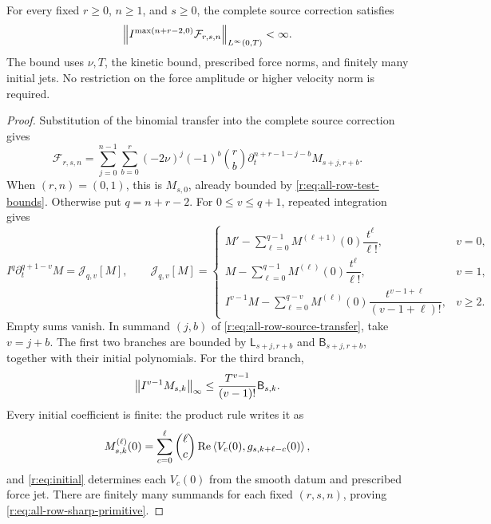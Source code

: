 \begin{proposition}
\label{r:prop:all-row-sharp-primitive}
For every fixed \(r\ge0\), \(n\ge1\), and \(s\ge0\), the complete
source correction satisfies
\begin{equation}
 \left\lVert I^{\max(n+r-2,0)}\mathcal F_{r,s,n}\right\rVert_{L^\infty(0,T)}<\infty.
 \label{r:eq:all-row-sharp-primitive}
\end{equation}
The bound uses \(\nu,T\), the kinetic bound, prescribed force norms,
and finitely many initial jets. No restriction on the force amplitude
or higher velocity norm is required.
\end{proposition}

\begin{proof}
Substitution of the binomial transfer into the complete source
correction gives
\begin{equation}
 \mathcal F_{r,s,n}
 =\sum_{j=0}^{n-1}\sum_{b=0}^r(-2\nu)^j(-1)^b\binom rb
 \partial_t^{n+r-1-j-b}M_{s+j,r+b}.
 \label{r:eq:all-row-source-transfer}
\end{equation}
When \((r,n)=(0,1)\), this is \(M_{s,0}\), already bounded by
\eqref{r:eq:all-row-test-bounds}. Otherwise put \(q=n+r-2\). For
\(0\le v\le q+1\), repeated integration gives
\begin{equation}
 I^q\partial_t^{q+1-v}M=\mathcal J_{q,v}[M],\qquad
 \mathcal J_{q,v}[M]=
 \begin{cases}
 M'-\displaystyle\sum_{\ell=0}^{q-1}
 M^{(\ell+1)}(0)\dfrac{t^\ell}{\ell!},&v=0,\\[7pt]
 M-\displaystyle\sum_{\ell=0}^{q-1}
 M^{(\ell)}(0)\dfrac{t^\ell}{\ell!},&v=1,\\[7pt]
 I^{v-1}M-\displaystyle\sum_{\ell=0}^{q-v}
 M^{(\ell)}(0)\dfrac{t^{v-1+\ell}}{(v-1+\ell)!},&v\ge2.
 \end{cases}
 \label{r:eq:all-row-sharp-integration}
\end{equation}
Empty sums vanish. In summand \((j,b)\) of
\eqref{r:eq:all-row-source-transfer}, take \(v=j+b\). The first two
branches are bounded by \(\mathsf L_{s+j,r+b}\) and
\(\mathsf B_{s+j,r+b}\), together with their initial polynomials.
For the third branch,
\[
 \left\lVert I^{v-1}M_{s,k}\right\rVert_\infty
 \le\frac{T^{v-1}}{(v-1)!}\mathsf B_{s,k}.
\]
Every initial coefficient is finite: the product rule writes it as
\[
 M_{s,k}^{(\ell)}(0)
 =\sum_{c=0}^{\ell}\binom\ell c
 \operatorname{Re}\left\langle V_c(0),g_{s,k+\ell-c}(0)\right\rangle,
\]
and \eqref{r:eq:initial} determines each \(V_c(0)\) from the smooth
datum and prescribed force jet. There are finitely many summands for
each fixed \((r,s,n)\), proving \eqref{r:eq:all-row-sharp-primitive}.
\end{proof}

